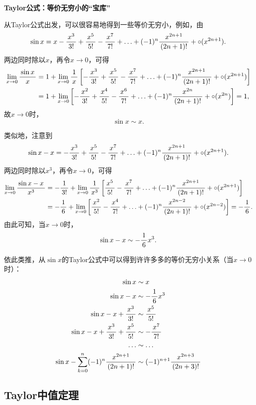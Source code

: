 \begin{shaded}
	{\bf Taylor公式：等价无穷小的“宝库”}
	
	从Taylor公式出发，可以很容易地得到一些等价无穷小，例如，由
	$$\sin x=x-\df{x^3}{3!}+\df{x^5}{5!}-\df{x^7}{7!}+
	\ldots+(-1)^n\df{x^{2n+1}}{(2n+1)!}+\circ(x^{2n+1}).$$
	两边同时除以$x$，再令$x\to 0$，可得
	\begin{align*}
		\limx{0}\df{\sin x}x&=1+\limx{0}\df1x\left[-\df{x^3}{3!}+
		\df{x^5}{5!}-\df{x^7}{7!}+ 
		\ldots+(-1)^n\df{x^{2n+1}}{(2n+1)!}+\circ(x^{2n+1})\right]\\
		&=1+\limx{0}\left[-\df{x^2}{3!}+
		\df{x^4}{5!}-\df{x^6}{7!}+ 
		\ldots+(-1)^n\df{x^{2n}}{(2n+1)!}+\circ(x^{2n})\right]=1,
	\end{align*}
	故$x\to 0$时，
	$$\sin x\sim x.$$
	
	类似地，注意到
	$$\sin x-x=-\df{x^3}{3!}+\df{x^5}{5!}-\df{x^7}{7!}+
	\ldots+(-1)^n\df{x^{2n+1}}{(2n+1)!}+\circ(x^{2n+1}).$$
	两边同时除以$x^3$，再令$x\to 0$，可得
	\begin{align*}
		\limx0\df{\sin x-x}{x^3}
		&=-\df1{3!}+\limx0\df1{x^3}\left[\df{x^5}{5!}-\df{x^7}{7!}+ 
		\ldots+(-1)^n\df{x^{2n+1}}{(2n+1)!}+\circ(x^{2n+1})\right]\\
		&=-\df16+\limx0\left[\df{x^2}{5!}-\df{x^4}{7!}+ 
		\ldots+(-1)^n\df{x^{2n-2}}{(2n+1)!}+\circ(x^{2n-2})\right]
		=-\df16.
	\end{align*}
	由此可知，当$x\to 0$时，
	$$\sin x-x\sim -\df16x^3.$$
	
	依此类推，从$\sin x$的Taylor公式中可以得到许许多多的等价无穷小关系（当$x\to 0$时）：
		\begin{align*}
			\sin x&\sim  x\\
			\sin x-x&\sim  -\df16x^3\\
			\sin x-x+\df{x^3}{3!} & \sim  \df{x^5}{5!}\\
			\sin x-x+\df{x^3}{3!}+\df{x^5}{5!} & \sim  -\df{x^7}{7!}\\
			\ldots & \sim  \ldots\\
			\sin x-\sum\limits_{k=0}^n(-1)^n\df{x^{2n+1}}{(2n+1)!}
			&\sim  (-1)^{n+1}\df{x^{2n+3}}{(2n+3)!}
		\end{align*}
\end{shaded}

\subsection{Taylor中值定理}

